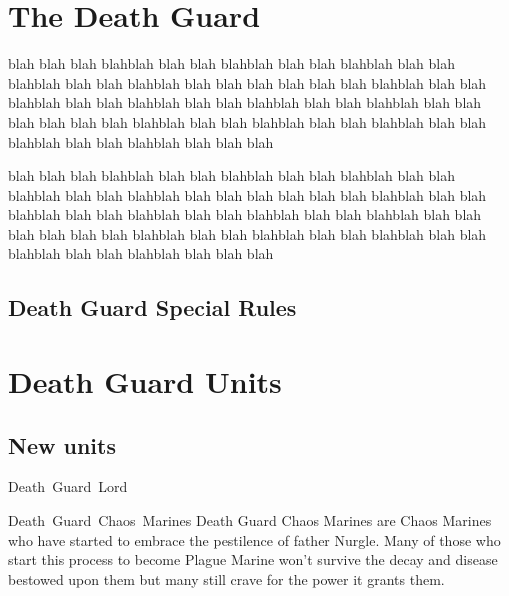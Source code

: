 \documentclass[a4paper, twocolumn]{article}
\begin{document}

\section{The Death Guard}
blah blah blah blahblah blah blah blahblah blah blah blahblah blah blah blahblah blah blah blahblah blah blah blah
blah blah blah blahblah blah blah blahblah blah blah blahblah blah blah blahblah blah blah blahblah blah blah blah
blah blah blah blahblah blah blah blahblah blah blah blahblah blah blah blahblah blah blah blahblah blah blah blah

blah blah blah blahblah blah blah blahblah blah blah blahblah blah blah blahblah blah blah blahblah blah blah blah
blah blah blah blahblah blah blah blahblah blah blah blahblah blah blah blahblah blah blah blahblah blah blah blah
blah blah blah blahblah blah blah blahblah blah blah blahblah blah blah blahblah blah blah blahblah blah blah blah

\subsection{Death Guard Special Rules}

%
\clearpage \onecolumn
\section{Death Guard Units}

\subsection{New units}

\unit{Death Guard Lord}{}
\statsEND

\unit{Death Guard Chaos Marines}{
  Death Guard Chaos Marines are Chaos Marines who have started to embrace the pestilence of father Nurgle. Many of
  those who start this process to become Plague Marine won't survive the decay and disease bestowed upon them
  but many still crave for the power it grants them.
}
\statsEND
\end{document}
